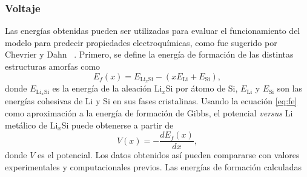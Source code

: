 \subsubsection{Voltaje}

\begin{table}[h]
    \centering
    \caption{Energías de formación obtenidas a través de la ecuación \ref{eq:fe}}
    \setlength\extrarowheight{2pt}
    \label{t:fe}
\end{table}
Las energías obtenidas pueden ser utilizadas para evaluar el funcionamiento del 
modelo para predecir propiedades electroquímicas, como fue sugerido por Chevrier
y Dahn ~\cite{chevrier2009}. Primero, se define la energía de formación de las 
distintas estructuras amorfas como
\begin{equation}\label{eq:fe}
    E_f(x) = E_{\text{Li}_x\text{Si}} - (x E_{\text{Li}} + E_{\text{Si}}),
\end{equation}
donde $E_{\text{Li}_x\text{Si}}$ es la energía de la aleación Li$_x$Si por átomo 
de Si, $E_{\text{Li}}$ y $E_{\text{Si}}$ son las energías cohesivas de Li y Si
en sus fases cristalinas. Usando
la ecuación \ref{eq:fe} como aproximación a la energía de formación de Gibbs, el 
potencial \textit{versus} Li metálico de Li$_x$Si puede obtenerse a partir de
\begin{equation}\label{eq:voltaje}
    V(x) = - \frac{dE_f(x)}{dx},
\end{equation}
donde $V$ es el potencial. Los datos obtenidos así pueden compararse con valores
experimentales y computacionales previos. Las energías de formación calculadas
